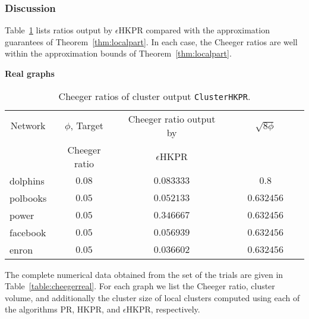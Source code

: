 \documentclass[runningheads,a4paper]{llncs}
\newcommand{\partitionalg}{\texttt{ClusterHKPR}}
\begin{document}
\subsubsection{Discussion}
Table~\ref{table:realhkprclusterresults} lists ratios output by $\epsilon$HKPR compared with the approximation guarantees of
Theorem~\ref{thm:localpart}.  In each case, the Cheeger ratios are well within
the approximation bounds of Theorem~\ref{thm:localpart}.

\begin{table}
\centering
\textbf{Real graphs}\\
\begin{tabular}{|p{2cm}|c|c|c|}
\hline
\multicolumn{1}{|c|}{Network} & $\phi$, Target & Cheeger ratio output by &
~~~~~$\sqrt{8\phi}$~~~~~\\
        & Cheeger ratio & $\epsilon$HKPR & \\
\hline\hline
dolphins & $0.08$ & $0.083333$ & $0.8$ \\
polbooks & $0.05$ & $0.052133$ & $0.632456$\\
power    & $0.05$ & $0.346667$ & $0.632456$ \\
facebook & $0.05$ & $0.056939$ & $0.632456$ \\
enron    & $0.05$ & $0.036602$ & $0.632456$\\
\hline 
\end{tabular}
\caption{Cheeger ratios of cluster output \partitionalg.}
\label{table:realhkprclusterresults}
\end{table}

The complete numerical data obtained from the set of the trials are given in
Table~\ref{table:cheegerreal}.  For each graph we list the Cheeger ratio,
cluster volume, and additionally the cluster size of local clusters computed
using each of the algorithms PR, HKPR, and $\epsilon$HKPR, respectively.
\end{document}
